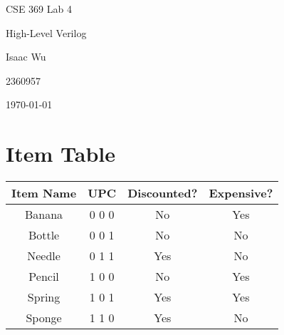 \documentclass{article}
\date{}
\newenvironment{solution}{\begin{mdframed}[style=SolutionFrame]}{\end{mdframed}}
\begin{document}
    
    
    \begin{titlepage}
        \centering
        \null
        \vspace{5cm}
        {\Huge CSE 369 Lab 4\par}
        \vspace{0.5cm}
        {\Large High-Level Verilog \par}
        \vfill
        {\hfill \Large Isaac Wu \par}
        {\hfill \large 2360957 \par}
        {\hfill \large \today \par}
    \end{titlepage}

\section{Item Table}
    \begin{solution}
        \begin{center}
        \Large\begin{tabular}{c|c|c|c}
            Item Name & UPC & Discounted? & Expensive? \\ \hline
            Banana & 0 0 0 & No & Yes \\ \hline
            Bottle & 0 0 1 & No & No \\ \hline
            Needle & 0 1 1 & Yes & No \\ \hline
            Pencil & 1 0 0 & No & Yes \\ \hline
            Spring & 1 0 1 & Yes & Yes \\ \hline
            Sponge & 1 1 0 & Yes & No \\ \hline
        \end{tabular}
        \end{center}
    \end{solution}
\end{document}
